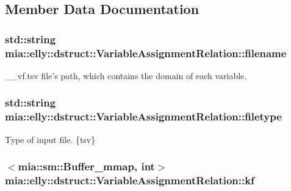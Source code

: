 \subsection{Member Data Documentation}
\hypertarget{classmia_1_1elly_1_1dstruct_1_1_variable_assignment_relation_aa48ef4351b3b43eaa3323cb20abb3531}{
\subsubsection[{filename}]{\setlength{\rightskip}{0pt plus 5cm}std\-::string mia\-::elly\-::dstruct\-::\-Variable\-Assignment\-Relation\-::filename}}\label{classmia_1_1elly_1_1dstruct_1_1_variable_assignment_relation_aa48ef4351b3b43eaa3323cb20abb3531}
\-\_\-\-\_\-vf.\-tsv file's path, which contains the domain of each variable. \hypertarget{classmia_1_1elly_1_1dstruct_1_1_variable_assignment_relation_a52e11bd663360277cfc7c7be61d79990}{
\subsubsection[{filetype}]{\setlength{\rightskip}{0pt plus 5cm}std\-::string mia\-::elly\-::dstruct\-::\-Variable\-Assignment\-Relation\-::filetype}}\label{classmia_1_1elly_1_1dstruct_1_1_variable_assignment_relation_a52e11bd663360277cfc7c7be61d79990}
Type of input file. \{tsv\} \hypertarget{classmia_1_1elly_1_1dstruct_1_1_variable_assignment_relation_a7e095b0ffcbf56d86e4fcc254a0039e8}{
\subsubsection[{kf}]{$<${\bf mia\-::sm\-::\-Buffer\-\_\-mmap}, int$>$ mia\-::elly\-::dstruct\-::\-Variable\-Assignment\-Relation\-::kf}}\label{classmia_1_1elly_1_1dstruct_1_1_variable_assignment_relation_a7e095b0ffcbf56d86e4fcc254a0039e8}
